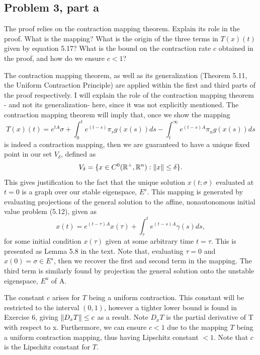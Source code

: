 \subsection{Problem 3, part a}
The proof relies on the contraction mapping theorem. Explain its role in the proof. What is the mapping? What is the origin of the three terms in $T(x)(t)$ given by equation 5.17? What is the bound on the contraction rate $c$ obtained in the proof, and how do we ensure $c < 1$?
\partbreak
\begin{solution}

    The contraction mapping theorem, as well as its generalization (Theorem 5.11, the Uniform Contraction Principle) are applied within the first and third parts of the proof respectively. I will explain the role of the contraction mapping theorem - and not its generalization- here, since it was not explicitly mentioned. The contraction mapping theorem will imply that, once we show the mapping 
    \[
    T(x)(t) = e^{tA}\sigma + \int_0^t e^{(t - s)}\pi_sg(x(s))ds - \int_t^\infty e^{(t - s)A}\pi_ug(x(s))ds
    \]
    is indeed a contraction mapping, then we are guaranteed to have a unique fixed point in our set $V_\delta$, defined as
    \[
    V_\delta = \{ x \in C^0(\mathbb{R}^+, \mathbb{R}^n): \norm{x} \leq \delta\}.
    \]
    This gives justification to the fact that the unique solution $x(t;\sigma)$ evaluated at $t = 0$ is a graph over our stable eigenspace, $E^s$. This mapping is generated by evaluating projections of the general solution to the affine, nonautonomous initial value problem (5.12), given as
    \[
    x(t) = e^{(t - \tau)A}x(\tau) + \int_\tau^t e^{(t - s)A}\gamma(s)ds,
    \]
    for some initial condition $x(\tau)$ given at some arbitrary time $t = \tau$. This is presented as Lemma 5.8 in the text. Note that, evaluating $\tau = 0$ and $x(0) = \sigma \in E^s$, then we recover the first and second term in the mapping. The third term is similarly found by projection the general solution onto the unstable eigenspace, $E^u$ of A. 

    \jump
    The constant $c$ arises for $T$ being a uniform contraction. This constant will be restricted to the interval $(0, 1)$, however a tighter lower bound is found in Exercise 6, giving $\norm{D_xT} \leq c$ as a result. Note $D_xT$ is the partial derivative of T with respect to x. Furthermore, we can ensure $c < 1$ due to the mapping $T$ being a uniform contraction mapping, thus having Lipschitz constant $< 1$. Note that $c$ is the Lipschitz constant for $T$.
\end{solution}

